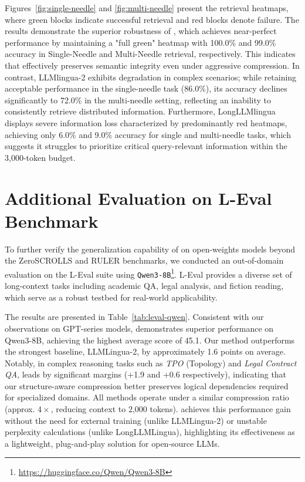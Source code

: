 \documentclass[11pt]{article}
\newcommand{\ours}{\text{BEAVER}\xspace}
\begin{document}
Figures~\ref{fig:single-needle} and \ref{fig:multi-needle} present the retrieval heatmaps, where green blocks indicate successful retrieval and red blocks denote failure. The results demonstrate the superior robustness of \ours, which achieves near-perfect performance by maintaining a "full green" heatmap with 100.0\% and 99.0\% accuracy in Single-Needle and Multi-Needle retrieval, respectively. This indicates that \ours effectively preserves semantic integrity even under aggressive compression. In contrast, LLMlingua-2 exhibits degradation in complex scenarios; while retaining acceptable performance in the single-needle task (86.0\%), its accuracy declines significantly to 72.0\% in the multi-needle setting, reflecting an inability to consistently retrieve distributed information. Furthermore, LongLLMlingua displays severe information loss characterized by predominantly red heatmaps, achieving only 6.0\% and 9.0\% accuracy for single and multi-needle tasks, which suggests it struggles to prioritize critical query-relevant information within the 3,000-token budget.

\section{Additional Evaluation on L-Eval Benchmark}
\label{appendix:leval_results}

To further verify the generalization capability of \ours on open-weights models beyond the ZeroSCROLLS and RULER benchmarks, we conducted an out-of-domain evaluation on the L-Eval suite \cite{an2024eval} using \texttt{Qwen3-8B}\footnote{\url{https://huggingface.co/Qwen/Qwen3-8B}}. L-Eval provides a diverse set of long-context tasks including academic QA, legal analysis, and fiction reading, which serve as a robust testbed for real-world applicability.

The results are presented in Table~\ref{tab:leval-qwen}. Consistent with our observations on GPT-series models, \ours demonstrates superior performance on Qwen3-8B, achieving the highest average score of 45.1. Our method outperforms the strongest baseline, LLMLingua-2, by approximately 1.6 points on average. Notably, in complex reasoning tasks such as \textit{TPO} (Topology) and \textit{Legal Contract QA}, \ours leads by significant margins (+1.9 and +0.6 respectively), indicating that our structure-aware compression better preserves logical dependencies required for specialized domains. All methods operate under a similar compression ratio (approx. $4\times$, reducing context to 2,000 tokens). \ours achieves this performance gain without the need for external training (unlike LLMLingua-2) or unstable perplexity calculations (unlike LongLLMLingua), highlighting its effectiveness as a lightweight, plug-and-play solution for open-source LLMs.
\end{document}
